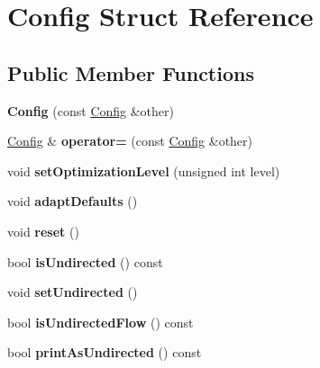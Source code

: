 \hypertarget{structConfig}{}\section{Config Struct Reference}
\label{structConfig}
\subsection*{Public Member Functions}
\begin{DoxyCompactItemize}
\item 
\mbox{\label{structConfig_a5e7857923b67cb5208e4b43d6a652c34}} 
{\bfseries Config} (const \mbox{\hyperlink{structConfig}{Config}} \&other)
\item 
\mbox{\label{structConfig_a66c8627e5a79d2ea4b0ef7917eeaa508}} 
\mbox{\hyperlink{structConfig}{Config}} \& {\bfseries operator=} (const \mbox{\hyperlink{structConfig}{Config}} \&other)
\item 
\mbox{\label{structConfig_a272ad8b443a79dce43b4da0626a873a6}} 
void {\bfseries set\+Optimization\+Level} (unsigned int level)
\item 
\mbox{\label{structConfig_a8c7c2786fbff45962b497210c571d5fe}} 
void {\bfseries adapt\+Defaults} ()
\item 
\mbox{\label{structConfig_a2a0e3519e79eaab8352dd810b5af4b22}} 
void {\bfseries reset} ()
\item 
\mbox{\label{structConfig_acab6b790c6340c7ea72ff289b963ae0a}} 
bool {\bfseries is\+Undirected} () const
\item 
\mbox{\label{structConfig_aec868ee550fffe033c93adb925bb1f4d}} 
void {\bfseries set\+Undirected} ()
\item 
\mbox{\label{structConfig_a64a2e2d45a2e148e8b184f5e1f7b0848}} 
bool {\bfseries is\+Undirected\+Flow} () const
\item 
\mbox{\label{structConfig_a4d9185857cdb3c18d79c6c047985f0e0}} 
bool {\bfseries print\+As\+Undirected} () const
\item 

\end{DoxyCompactItemize}
